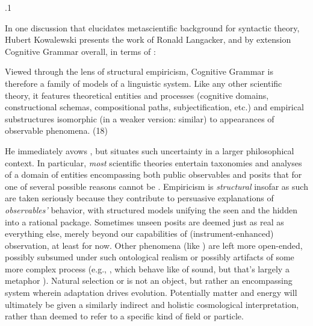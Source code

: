 \documentclass[11pt, twocolumn]{article}
\begin{document}
\p.1{%
\:\+In one discussion that elucidates metascientific
background for syntactic theory, Hubert Kowalewski
presents the work of Ronald Langacker, and by extension
Cognitive Grammar overall, in terms 
of :\< \upAdj{3pt}

\begin{blockQuote}
\+Viewed through the lens of structural empiricism, Cognitive Grammar
is therefore a family of models of a linguistic system. \> Like any other scientific theory,
it features theoretical entities and processes (cognitive domains,
constructional schemas, compositional paths, subjectification, etc.)
and empirical substructures isomorphic (in a weaker version: similar) to appearances
of observable phenomena.\< (18)
\end{blockQuote}

\nip{}%
\+He immediately avows , but situates such uncertainty in a larger philosophical context. \> In particular, \textit{most} scientific theories entertain taxonomies and analyses of
a domain of entities encompassing both public observables and 
posits that \mdash{} for one of several possible reasons \mdash{} cannot be . \> Empiricism is \textit{structural} insofar as such  are
taken seriously because they contribute to persuasive explanations
of \textit{observables'} behavior, with structured models unifying the seen
and the hidden into a rational package. \> Sometimes unseen posits are
deemed just as real as everything else, merely beyond our capabilities
of (instrument-enhanced) observation, at least for now. \> Other phenomena
(like ) are left more open-ended, possibly subsumed under
such ontological realism or possibly artifacts of some more complex process
(e.g., , which behave like  of sound, but
that's largely a metaphor ). \> Natural selection or 
is not an object, but rather an encompassing system wherein adaptation drives
evolution. \> Potentially  matter and energy will ultimately
be given a similarly indirect and holistic cosmological interpretation,
rather than deemed to refer to a specific kind of field or particle.\<\;
} %
\end{document}
